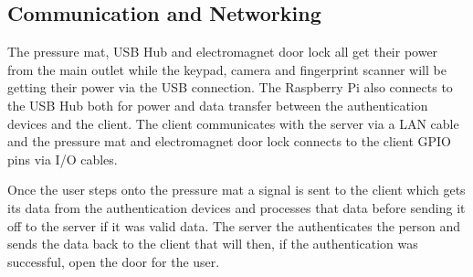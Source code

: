 \subsection{Communication and Networking}
The pressure mat, USB Hub and electromagnet door lock all get their power from the main outlet while the keypad, camera and fingerprint scanner will be getting their power via the USB connection. The Raspberry Pi also connects to the USB Hub both for power and data transfer between the authentication devices and the client. The client communicates with the server via a LAN cable and the pressure mat and electromagnet door lock connects to the client GPIO pins via I/O cables. 

Once the user steps onto the pressure mat a signal is sent to the client which gets its data from the authentication devices and processes that data before sending it off to the server if it was valid data. The server the authenticates the person and sends the data back to the client that will then, if the authentication was successful, open the door for the user.